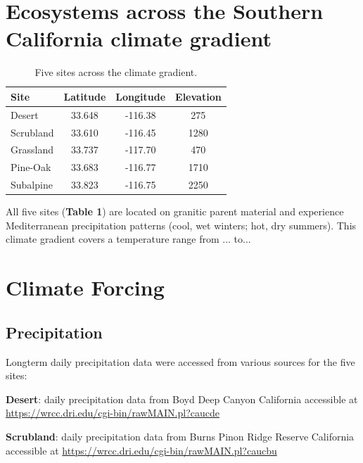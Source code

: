 \documentclass[letterpaper, 10pt]{article}
\begin{document}
\section{\large Ecosystems across the Southern California climate gradient}

\begin{table}[h!]
  \begin{center}
    \caption{Five sites across the climate gradient.}
    \label{tab: table1}
    \begin{tabular}{lccc}
      \toprule %
      \textbf{Site} & \textbf{Latitude} & \textbf{Longitude} & \textbf{Elevation}\\
      \midrule %
      Desert       & 33.648 & -116.38 & 275\\
      Scrubland & 33.610 & -116.45 & 1280\\
      Grassland & 33.737 & -117.70 & 470\\
      Pine-Oak  & 33.683 & -116.77  & 1710\\
      Subalpine & 33.823 & -116.75  & 2250\\
      \bottomrule %
    \end{tabular}
  \end{center}
\end{table}

All five sites (\textbf{Table 1}) are located on granitic parent material and experience Mediterranean precipitation patterns (cool, wet winters; hot, dry summers). This climate gradient covers a temperature range from ... to...



\section{\large Climate Forcing}

\subsection{Precipitation}
Longterm daily precipitation data were accessed from various sources for the five sites:

\textbf{Desert}: daily precipitation data from Boyd Deep Canyon California accessible at \url{https://wrcc.dri.edu/cgi-bin/rawMAIN.pl?caucde}

\textbf{Scrubland}: daily precipitation data from Burns Pinon Ridge Reserve California accessible at \url{https://wrcc.dri.edu/cgi-bin/rawMAIN.pl?caucbu}
\end{document}

